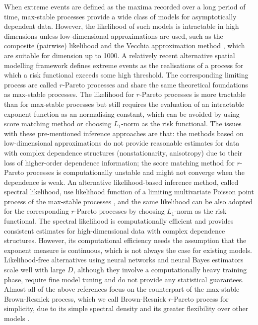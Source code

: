 \documentclass[12pt]{article}
\begin{document}
When extreme events are defined as the maxima recorded over a long period of time, max-stable processes \citep{deHaan:1984, Schlather:2002} provide a wide class of models for asymptotically dependent data. However, the likelihood of such models is intractable in high dimensions unless low-dimensional approximations are used, such as the composite (pairwise) likelihood \citep{Padoan.etal:2010,Davison.etal:2012} and the Vecchia approximation method \citep{Huser.Zhong:2023}, which are suitable for dimension up to 1000. A relatively recent alternative spatial modelling framework defines extreme events as the realisations of a process for which a risk functional exceeds some high threshold. The corresponding limiting process are called $r$-Pareto processes \citep{Ferreira.deHaan:2014, Dombry.Ribatet:2015, deFondeville.Davison:2018, deFondeville.Davison:2022} and share the same theoretical foundations as max-stable processes. The likelihood for $r$-Pareto processes is more tractable than for max-stable processes but still requires the evaluation of an intractable exponent function as an normalising constant, which can be avoided by using score matching method \citep{deFondeville.Davison:2018,Lederer.Oesting:2023} or choosing $L_1$-norm as the risk functional. The issues with these pre-mentioned inference approaches are that: the methods based on low-dimensional approximations do not provide reasonable estimates for data with complex dependence structures (nonstationarity, anisotropy) due to their loss of higher-order dependence information; the score matching method for $r$-Pareto processes is computationally unstable and might not converge when the dependence is weak. An alternative likelihood-based inference method, called spectral likelihood, use likelihood function of a limiting multivariate Poisson point process of the max-stable processes \citep{Coles.Tawn:1991,Engelke.etal:2015,Wadsworth.Tawn:2014}, and the same likelihood can be also adopted for the corresponding $r$-Pareto processes by choosing $L_1$-norm as the risk functional. The spectral likelihood is computationally efficient and provides consistent estimates for high-dimensional data with complex dependence structures. However, its computational efficiency needs the assumption that the exponent measure is continuous, which is not always the case for existing models. Likelihood-free alternatives using neural networks \citep{Lenzi.etal:2023} and neural Bayes estimators \citep{Sainsbury.Zammit.Huser:2024, Richards.etal:2024} scale well with large $D$, although they involve a computationally heavy training phase, require fine model tuning and do not provide any statistical guarantees. Almost all of the above references focus on the counterpart of the max-stable Brown-Resnick process, which we call Brown-Resnick $r$-Pareto process for simplicity, due to its simple spectral density and its greater flexibility over other models \citep[see, e.g.,][]{deFondeville.Davison:2018, Richards.etal:2024, Hector.Reich:2024}.          
\end{document}
